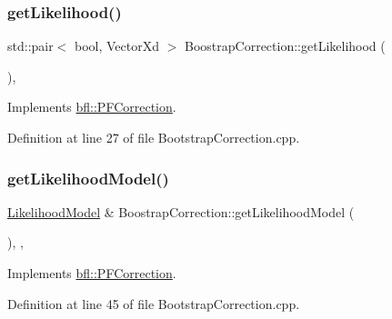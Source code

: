 \subsubsection{\texorpdfstring{get\+Likelihood()}{getLikelihood()}}
{\footnotesize\ttfamily std\+::pair$<$ bool, Vector\+Xd $>$ Boostrap\+Correction\+::get\+Likelihood (\begin{DoxyParamCaption}{ }\end{DoxyParamCaption})\hspace{0.3cm}{\ttfamily [override]}, {\ttfamily [virtual]}}



Implements \mbox{\hyperlink{classbfl_1_1PFCorrection_ab6eca766077c4ab1db3417dab6c44d27}{bfl\+::\+P\+F\+Correction}}.



Definition at line 27 of file Bootstrap\+Correction.\+cpp.

\mbox{\label{classbfl_1_1BoostrapCorrection_aae2f5698ba37895b6193f51441f96f38}} 
\subsubsection{\texorpdfstring{get\+Likelihood\+Model()}{getLikelihoodModel()}}
{\footnotesize\ttfamily \mbox{\hyperlink{classbfl_1_1LikelihoodModel}{Likelihood\+Model}} \& Boostrap\+Correction\+::get\+Likelihood\+Model (\begin{DoxyParamCaption}{ }\end{DoxyParamCaption})\hspace{0.3cm}{\ttfamily [override]}, {\ttfamily [protected]}, {\ttfamily [virtual]}}



Implements \mbox{\hyperlink{classbfl_1_1PFCorrection_ad812d0b488e0882b246dd19d4f6818e1}{bfl\+::\+P\+F\+Correction}}.



Definition at line 45 of file Bootstrap\+Correction.\+cpp.

\mbox{\label{classbfl_1_1BoostrapCorrection_a4d11bb3e7e27dcd62bb7e1b5df83c8db}} 

